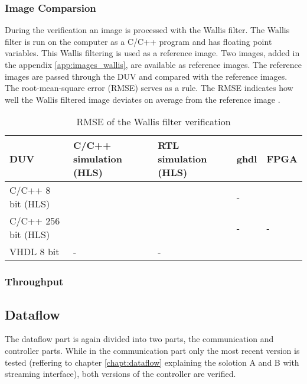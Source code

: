\subsubsection*{Image Comparsion}
During the verification an image is processed with the Wallis filter. The Wallis filter is run on the computer as a C/C++ program and has floating point variables. This Wallis filtering is used as a reference image. Two images, added in the appendix \ref{app:images_wallis}, are available as reference images.
The reference images are passed through the DUV and compared with the reference images. The root-mean-square error (RMSE) serves as a rule. The RMSE indicates how well the  Wallis filtered image deviates on average from the reference image \cite{rmse}.

\begin{table}[tb!]
    \centering
    \begin{tabular}{l l l l l}
        \toprule
        DUV & C/C++ simulation (HLS) & RTL simulation (HLS) & ghdl & FPGA \\
        \midrule
        C/C++ 8 bit (HLS) &  &  & - & \\
        C/C++ 256 bit (HLS) &  & & - & - \\
        VHDL 8 bit & - & - &  & \\
        \bottomrule
    \end{tabular}
    \caption{RMSE of the Wallis filter verification}
    \label{tab:rmse}
\end{table}



\subsubsection*{Throughput}


%
%
\subsection{Dataflow}\label{ch:verification:dataflow}
The dataflow part is again divided into two parts, the communication and
controller parts. While in the communication part only the most recent version
is tested (reffering to chapter \ref{chapt:dataflow} explaining the solotion
A and B with streaming interface), both versions of the controller are verified.

